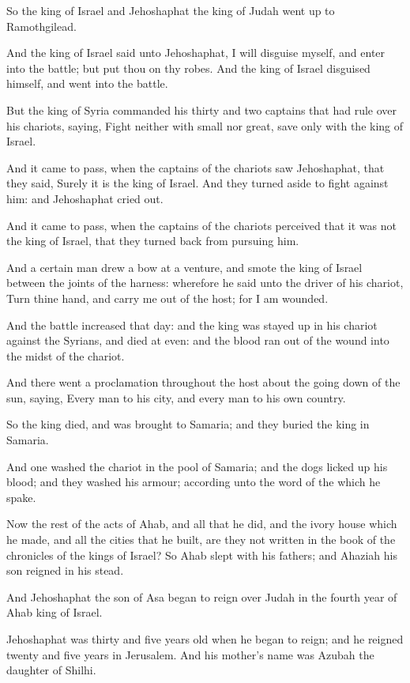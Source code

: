 \verse So the king of Israel and Jehoshaphat the king of Judah went up to Ramothgilead.

\verse And the king of Israel said unto Jehoshaphat, I will disguise myself, and enter into the battle; but put thou on thy robes. And the king of Israel disguised himself, and went into the battle.

\verse But the king of Syria commanded his thirty and two captains that had rule over his chariots, saying, Fight neither with small nor great, save only with the king of Israel.

\verse And it came to pass, when the captains of the chariots saw Jehoshaphat, that they said, Surely it is the king of Israel. And they turned aside to fight against him: and Jehoshaphat cried out.

\verse And it came to pass, when the captains of the chariots perceived that it was not the king of Israel, that they turned back from pursuing him.

\verse And a certain man drew a bow at a venture, and smote the king of Israel between the joints of the harness: wherefore he said unto the driver of his chariot, Turn thine hand, and carry me out of the host; for I am wounded.

\verse And the battle increased that day: and the king was stayed up in his chariot against the Syrians, and died at even: and the blood ran out of the wound into the midst of the chariot.

\verse And there went a proclamation throughout the host about the going down of the sun, saying, Every man to his city, and every man to his own country.

\verse So the king died, and was brought to Samaria; and they buried the king in Samaria.

\verse And one washed the chariot in the pool of Samaria; and the dogs licked up his blood; and they washed his armour; according unto the word of the \LORD which he spake.

\verse Now the rest of the acts of Ahab, and all that he did, and the ivory house which he made, and all the cities that he built, are they not written in the book of the chronicles of the kings of Israel?  \verse So Ahab slept with his fathers; and Ahaziah his son reigned in his stead.

\verse And Jehoshaphat the son of Asa began to reign over Judah in the fourth year of Ahab king of Israel.

\verse Jehoshaphat was thirty and five years old when he began to reign; and he reigned twenty and five years in Jerusalem. And his mother's name was Azubah the daughter of Shilhi.

